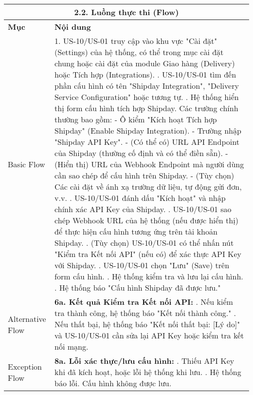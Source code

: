 \begin{longtable}{|m{4cm}|p{11cm}|}
\hline
\multicolumn{2}{|c|}{\textbf{2.2. Luồng thực thi (Flow)}} \\
\hline
\textbf{Mục} & \textbf{Nội dung} \\
\hline
Basic Flow & 1. US-10/US-01 truy cập vào khu vực "Cài đặt" (Settings) của hệ thống, có thể trong mục cài đặt chung hoặc cài đặt của module Giao hàng (Delivery) hoặc Tích hợp (Integrations). \newline 2. US-10/US-01 tìm đến phần cấu hình có tên "Shipday Integration", "Delivery Service Configuration" hoặc tương tự. \newline 3. Hệ thống hiển thị form cấu hình tích hợp Shipday. Các trường chính thường bao gồm: \newline    - Ô kiểm "Kích hoạt Tích hợp Shipday" (Enable Shipday Integration). \newline    - Trường nhập "Shipday API Key". \newline    - (Có thể có) URL API Endpoint của Shipday (thường cố định và có thể điền sẵn). \newline    - (Hiển thị) URL của Webhook Endpoint mà người dùng cần sao chép để cấu hình trên Shipday. \newline    - (Tùy chọn) Các cài đặt về ánh xạ trường dữ liệu, tự động gửi đơn, v.v. \newline 4. US-10/US-01 đánh dấu "Kích hoạt" và nhập chính xác API Key của Shipday. \newline 5. US-10/US-01 sao chép Webhook URL của hệ thống (nếu được hiển thị) để thực hiện cấu hình tương ứng trên tài khoản Shipday. \newline 6. (Tùy chọn) US-10/US-01 có thể nhấn nút "Kiểm tra Kết nối API" (nếu có) để xác thực API Key với Shipday. \newline 7. US-10/US-01 chọn "Lưu" (Save) trên form cấu hình. \newline 8. Hệ thống kiểm tra và lưu lại cấu hình. \newline 9. Hệ thống báo "Cấu hình Shipday đã được lưu." \\
\hline
Alternative Flow & \textbf{6a. Kết quả Kiểm tra Kết nối API:} \newline    1. Nếu kiểm tra thành công, hệ thống báo "Kết nối thành công." \newline    2. Nếu thất bại, hệ thống báo "Kết nối thất bại: [Lý do]" và US-10/US-01 cần sửa lại API Key hoặc kiểm tra kết nối mạng. \\
\hline
Exception Flow & \textbf{8a. Lỗi xác thực/lưu cấu hình:} \newline    1. Thiếu API Key khi đã kích hoạt, hoặc lỗi hệ thống khi lưu. \newline    2. Hệ thống báo lỗi. Cấu hình không được lưu. \\

\end{longtable}
